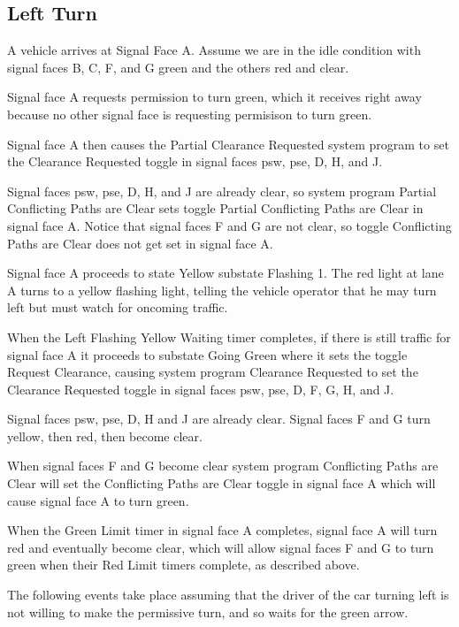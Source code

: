 \documentclass[letterpaper,twoside]{article}
\begin{document}


\subsection{Left Turn}

A vehicle arrives at Signal Face A.  Assume we are in the idle condition
with signal faces B, C, F, and G green and the others red and clear.

Signal face A requests permission to turn green, which it receives right
away because no other signal face is requesting permisison to turn green.

Signal face A then causes the Partial Clearance Requested system program
to set the Clearance Requested toggle in signal faces psw, pse, D, H, and J.

Signal faces psw, pse, D, H, and J are already clear, so system program Partial
Conflicting Paths are Clear sets toggle Partial Conflicting Paths are Clear
in signal face A.
Notice that signal faces F and G are not clear, so toggle Conflicting Paths
are Clear does not get set in signal face A.

Signal face A proceeds to state Yellow substate Flashing 1.  The red light
at lane A turns to a yellow flashing light, telling the vehicle operator
that he may turn left but must watch for oncoming traffic.

When the Left Flashing Yellow Waiting timer completes, if there is still
traffic for
signal face A it proceeds to substate Going Green where it sets the
toggle Request Clearance, causing system program Clearance Requested to
set the Clearance Requested toggle in signal faces psw, pse, D, F, G, H, and J.

Signal faces psw, pse, D, H and J are already clear.  Signal faces F and G turn
yellow, then red, then become clear.

When signal faces F and G become clear system program Conflicting Paths
are Clear will set the Conflicting Paths are Clear toggle in signal face
A which will cause signal face A to turn green.

When the Green Limit timer in signal face A completes, signal face
A will turn red and eventually become clear, which will allow
signal faces F and G to turn green when their Red Limit timers complete,
as described above.

The following events take place assuming that the driver of the
car turning left is not willing to make the permissive turn,
and so waits for the green arrow.
\end{document}
